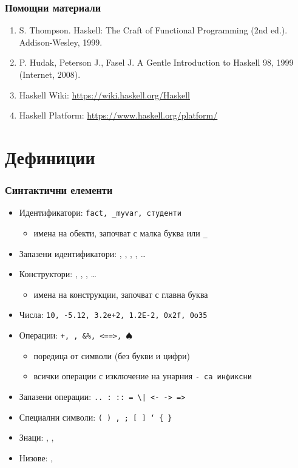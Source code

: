 \documentclass{beamer}
\begin{document}
\begin{frame}
  \frametitle{Помощни материали}

  \begin{enumerate}
  \item S. Thompson. Haskell: The Craft of Functional Programming (2nd ed.). Addison-Wesley, 1999.
  \item P. Hudak, Peterson J., Fasel J. A Gentle Introduction to Haskell 98, 1999 (Internet, 2008).
  \item Haskell Wiki: \url{https://wiki.haskell.org/Haskell}
  \item Haskell Platform: \url{https://www.haskell.org/platform/}
  \end{enumerate}
\end{frame}

\section{Дефиниции}

\begin{frame}[fragile]
  \frametitle{Синтактични елементи}

  \begin{itemize}[<+->]
  \item Идентификатори: \tt{fact}, \tt{\_myvar}, \tt{студенти}
    \begin{itemize}
    \item имена на обекти, започват с малка буква или \tt\_
    \end{itemize}
  \item Запазени идентификатори: , , , , \ldots
  \item Конструктори: , , , \ldots
    \begin{itemize}
    \item имена на конструкции, започват с главна буква
    \end{itemize}
  \item Числа: \tt{10}, \tt{-5.12}, \tt{3.2e+2}, \tt{1.2E-2}, \tt{0x2f}, \tt{0o35}
  \item Операции: \tt+, \tt*, \tt{\&\%}, \tt{<==>}, \tt{$\spadesuit$}
    \begin{itemize}
    \item поредица от символи (без букви и цифри)
    \item всички операции с изключение на унарния \tt- са инфиксни
    \end{itemize}
  \item Запазени операции: \tt{..} \tt: \tt{::} \tt= \tt\textbackslash \tt| \tt{<-} \tt{->} \tt@ \tt\~ \tt{=>}
  \item Специални символи: \tt( \tt) \tt, \tt; \tt[ \tt] \tt` \tt\{ \tt\}
  \item Знаци: , , 
  \item Низове: , 
  \end{itemize}
\end{frame}
\end{document}
